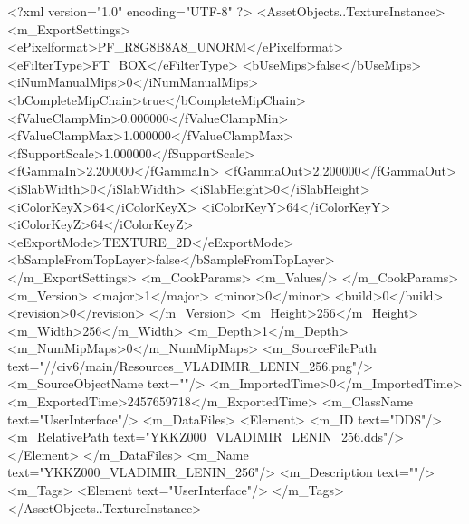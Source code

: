 <?xml version="1.0" encoding="UTF-8" ?>
<AssetObjects..TextureInstance>
	<m_ExportSettings>
		<ePixelformat>PF_R8G8B8A8_UNORM</ePixelformat>
		<eFilterType>FT_BOX</eFilterType>
		<bUseMips>false</bUseMips>
		<iNumManualMips>0</iNumManualMips>
		<bCompleteMipChain>true</bCompleteMipChain>
		<fValueClampMin>0.000000</fValueClampMin>
		<fValueClampMax>1.000000</fValueClampMax>
		<fSupportScale>1.000000</fSupportScale>
		<fGammaIn>2.200000</fGammaIn>
		<fGammaOut>2.200000</fGammaOut>
		<iSlabWidth>0</iSlabWidth>
		<iSlabHeight>0</iSlabHeight>
		<iColorKeyX>64</iColorKeyX>
		<iColorKeyY>64</iColorKeyY>
		<iColorKeyZ>64</iColorKeyZ>
		<eExportMode>TEXTURE_2D</eExportMode>
		<bSampleFromTopLayer>false</bSampleFromTopLayer>
	</m_ExportSettings>
	<m_CookParams>
		<m_Values/>
	</m_CookParams>
	<m_Version>
		<major>1</major>
		<minor>0</minor>
		<build>0</build>
		<revision>0</revision>
	</m_Version>
	<m_Height>256</m_Height>
	<m_Width>256</m_Width>
	<m_Depth>1</m_Depth>
	<m_NumMipMaps>0</m_NumMipMaps>
	<m_SourceFilePath text="//civ6/main/Resources_VLADIMIR_LENIN_256.png"/>
	<m_SourceObjectName text=""/>
	<m_ImportedTime>0</m_ImportedTime>
	<m_ExportedTime>2457659718</m_ExportedTime>
	<m_ClassName text="UserInterface"/>
	<m_DataFiles>
		<Element>
			<m_ID text="DDS"/>
			<m_RelativePath text="YKKZ000_VLADIMIR_LENIN_256.dds"/>
		</Element>
	</m_DataFiles>
	<m_Name text="YKKZ000_VLADIMIR_LENIN_256"/>
	<m_Description text=""/>
	<m_Tags>
		<Element text="UserInterface"/>
	</m_Tags>
</AssetObjects..TextureInstance>


